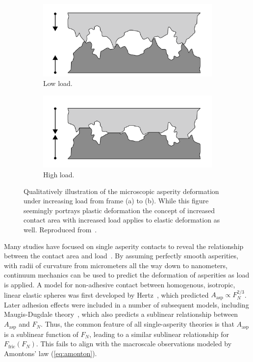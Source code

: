 \begin{figure}[H]
  \centering
  \begin{subfigure}[b]{0.49\textwidth}
      \centering
      \includegraphics[width=\textwidth]{figures/theory/asperities_top.png}
      \caption{Low load.}
      \label{fig:asp_left}
  \end{subfigure}
  \hfill
  \begin{subfigure}[b]{0.49\textwidth}
      \centering
      \includegraphics[width=\textwidth]{figures/theory/asperities_bottom.png}
      \caption{High load.}
      \label{fig:asp_right}
  \end{subfigure}
  \hfill
     \caption{Qualitatively illustration of the microscopic asperity deformation
     under increasing load from frame (a) to (b). While this figure seemingly portrays plastic deformation the concept of increased contact area with increased load applies to elastic deformation as well. Reproduced from~\cite{wiki:asperities}.}
     \label{fig:asperity_contact}
\end{figure}

Many studies have focused on single asperity contacts to reveal the relationship
between the contact area and load~\cite{Szlufarska_2008, PhysRevLett.56.930,
perry_scanning_2004}. By assuming perfectly smooth asperities, with radii of
curvature from micrometers all the way down to nanometers, continuum mechanics
can be used to predict the deformation of asperities as load is applied. A model
for non-adhesive contact between homogenous, isotropic, linear elastic spheres
was first developed by Hertz~\cite{HertzOnTC}, which predicted $A_{\text{asp}}
\propto F_N^{2/3}$. Later adhesion effects were included in a number of
subsequent models, including Maugis-Dugdale theory~\cite{MAUGIS1992243}, which
also predicts a sublinear relationship between $A_{\text{asp}}$ and $F_N$. Thus,
the common feature of all single-asperity theories is that $A_{\text{asp}}$ is a
sublinear function of $F_N$, leading to a similar sublinear relationship for
$F_\text{fric}(F_N)$. This fails to align with the macroscale observations
modeled by Amontons’ law (\cref{eq:amonton}).


